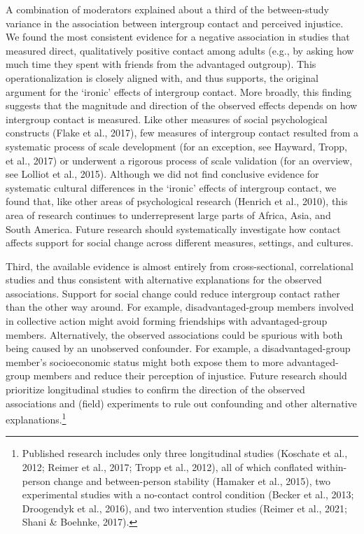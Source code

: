 \documentclass[12pt, letterpaper]{article}
\begin{document}
A combination of moderators explained about a third of the between-study
variance in the association between intergroup contact and perceived
injustice. We found the most consistent evidence for a negative
association in studies that measured direct, qualitatively positive
contact among adults (e.g., by asking how much time they spent with
friends from the advantaged outgroup). This operationalization is
closely aligned with, and thus supports, the original argument for the
`ironic' effects of intergroup contact. More broadly, this finding
suggests that the magnitude and direction of the observed effects
depends on how intergroup contact is measured. Like other measures of
social psychological constructs (Flake et al., 2017), few measures of
intergroup contact resulted from a systematic process of scale
development (for an exception, see Hayward, Tropp, et al., 2017) or
underwent a rigorous process of scale validation (for an overview, see
Lolliot et al., 2015). Although we did not find conclusive evidence for
systematic cultural differences in the `ironic' effects of intergroup
contact, we found that, like other areas of psychological research
(Henrich et al., 2010), this area of research continues to
underrepresent large parts of Africa, Asia, and South America. Future
research should systematically investigate how contact affects support
for social change across different measures, settings, and cultures.

Third, the available evidence is almost entirely from cross-sectional,
correlational studies and thus consistent with alternative explanations
for the observed associations. Support for social change could reduce
intergroup contact rather than the other way around. For example,
disadvantaged-group members involved in collective action might avoid
forming friendships with advantaged-group members. Alternatively, the
observed associations could be spurious with both being caused by an
unobserved confounder. For example, a disadvantaged-group member's
socioeconomic status might both expose them to more advantaged-group
members and reduce their perception of injustice. Future research should
prioritize longitudinal studies to confirm the direction of the observed
associations and (field) experiments to rule out confounding and other
alternative explanations.\footnote{Published research includes only
  three longitudinal studies (Koschate et al., 2012; Reimer et al.,
  2017; Tropp et al., 2012), all of which conflated within-person change
  and between-person stability (Hamaker et al., 2015), two experimental
  studies with a no-contact control condition (Becker et al., 2013;
  Droogendyk et al., 2016), and two intervention studies (Reimer et al.,
  2021; Shani \& Boehnke, 2017).}
\end{document}
